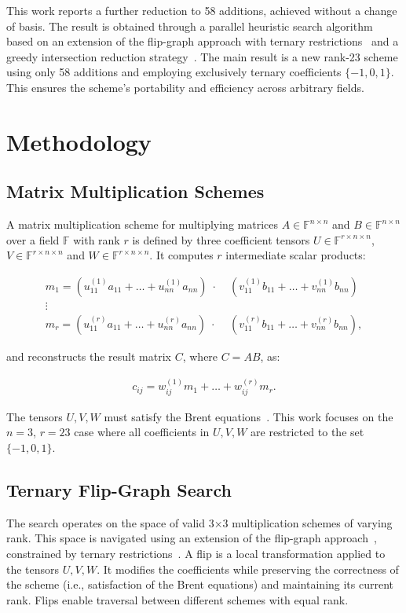 \documentclass{article}
\begin{document}
This work reports a further reduction to 58 additions, achieved without a change of basis. The result is obtained through a parallel heuristic search algorithm based on an extension of the flip-graph approach with ternary restrictions~\citep{perminov2025fast} and a greedy intersection reduction strategy~\citep{perminov2025parallel}. The main result is a new rank-23 scheme using only 58 additions and employing exclusively ternary coefficients $\{-1, 0, 1\}$. This ensures the scheme's portability and efficiency across arbitrary fields.

\section{Methodology}

\subsection{Matrix Multiplication Schemes}
\label{subsec:schemes}

A matrix multiplication scheme for multiplying matrices $A \in \mathbb{F}^{n \times n}$ and $B \in \mathbb{F}^{n \times n}$ over a field $\mathbb{F}$ with rank $r$ is defined by three coefficient tensors $U \in \mathbb{F}^{r \times n \times n}$, $V \in \mathbb{F}^{r \times n \times n}$ and $W \in \mathbb{F}^{r \times n \times n}$. It computes $r$ intermediate scalar products:

\begin{align*}
m_1 = (u^{(1)}_{11} a_{11} + \dots + u^{(1)}_{nn} a_{nn})\;\cdot\; & (v^{(1)}_{11} b_{11} + \dots + v^{(1)}_{nn} b_{nn})\\
\vdots\;  \\
m_r = (u^{(r)}_{11} a_{11} + \dots + u^{(r)}_{nn} a_{nn})\;\cdot\; & (v^{(r)}_{11} b_{11} + \dots + v^{(r)}_{nn} b_{nn}),
\end{align*}

and reconstructs the result matrix $C$, where $C = AB$, as:

\begin{align*}
c_{ij} = w^{(1)}_{ij}m_1 + \dots + w^{(r)}_{ij}m_r.
\end{align*}

The tensors $U, V, W$ must satisfy the Brent equations~\citep{brent1970algorithms}. This work focuses on the $n=3$, $r=23$ case where all coefficients in $U, V, W$ are restricted to the set $\{-1, 0, 1\}$.


\subsection{Ternary Flip-Graph Search}
\label{subsec:flip_graph}
The search operates on the space of valid 3×3 multiplication schemes of varying rank. This space is navigated using an extension of the flip-graph approach~\citep{kauers2023flip}, constrained by ternary restrictions~\citep{perminov2025fast}. A flip is a local transformation applied to the tensors $U, V, W$. It modifies the coefficients while preserving the correctness of the scheme (i.e., satisfaction of the Brent equations) and maintaining its current rank. Flips enable traversal between different schemes with equal rank.
\end{document}
